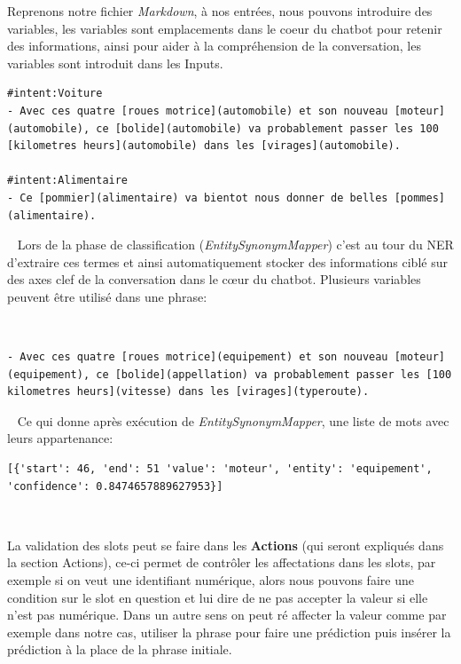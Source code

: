 Reprenons notre fichier \textit{Markdown}, à nos entrées, nous pouvons introduire des variables, les variables sont emplacements dans le coeur du chatbot pour retenir des informations, ainsi pour aider à la compréhension de la conversation, les variables sont introduit dans les Inputs.
\ \linebreak
\begin{lstlisting}
#intent:Voiture
- Avec ces quatre [roues motrice](automobile) et son nouveau [moteur](automobile), ce [bolide](automobile) va probablement passer les 100 [kilometres heurs](automobile) dans les [virages](automobile).

#intent:Alimentaire
- Ce [pommier](alimentaire) va bientot nous donner de belles [pommes](alimentaire).
\end{lstlisting}
\ \linebreak
Lors de la phase de classification (\textit{EntitySynonymMapper}) c'est au tour du NER d'extraire ces termes et ainsi automatiquement stocker des informations ciblé sur des axes clef de la conversation dans le cœur du chatbot. Plusieurs variables peuvent être utilisé dans une phrase:

\ \linebreak
\begin{lstlisting}
- Avec ces quatre [roues motrice](equipement) et son nouveau [moteur](equipement), ce [bolide](appellation) va probablement passer les [100 kilometres heurs](vitesse) dans les [virages](typeroute).
\end{lstlisting}

\ \linebreak
Ce qui donne après exécution de \textit{EntitySynonymMapper}, une liste de mots avec leurs appartenance:

\begin{lstlisting}
[{'start': 46, 'end': 51 'value': 'moteur', 'entity': 'equipement', 'confidence': 0.8474657889627953}]
\end{lstlisting}
\ \linebreak 

La validation des slots peut se faire dans les \textbf{Actions} (qui seront expliqués dans la section Actions), ce-ci permet de contrôler les affectations dans les slots, par exemple si on veut une identifiant numérique, alors nous pouvons faire une condition sur le slot en question et lui dire de ne  pas accepter la valeur si elle n'est pas numérique. Dans un autre sens on peut ré affecter la valeur comme par exemple dans notre cas, utiliser la phrase pour faire une prédiction puis insérer la prédiction à la place de la phrase initiale.

